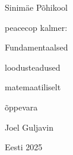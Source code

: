 \begin{titlepage}
\par{Sinimäe Põhikool}
\vspace{0.3\textheight}
\par{peacecop kalmer:}
\LARGE
\par{Fundamentaalsed}
\par{loodusteadused}
\par{matemaatiliselt}
\normalsize
\par{õppevara}
\vspace{0.3\textheight}
\begin{flushright}
\par{Joel Guljavin}
\end{flushright}
\vfill
Eesti
\hfill
2025
\end{titlepage}
